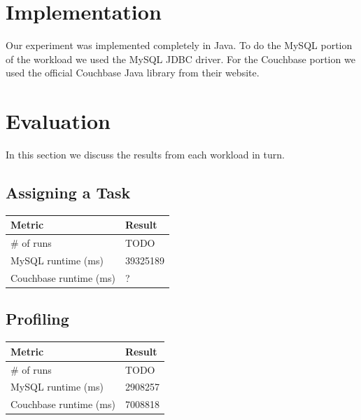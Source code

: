 \documentclass[]{IEEEtran}
\begin{document}
\section{Implementation}\label{sec:implementation}
Our experiment was implemented completely in Java. To do the MySQL portion of
the workload we used the MySQL JDBC driver. For the Couchbase portion we used
the official Couchbase Java library from their website.

\section{Evaluation}\label{sec:eval}
In this section we discuss the results from each workload in turn.


\subsection{Assigning a Task}

\begin{center}
\begin{tabular}{|l|l|}
	\hline
	{\bf Metric} & {\bf Result} \\
	\hline
        \# of runs & TODO \\
        \hline
        MySQL runtime (ms) & 39325189 \\
	\hline
        Couchbase runtime (ms) & ? \\
        \hline
\end{tabular}
\end{center}

\subsection{Profiling}

\begin{center}
\begin{tabular}{|l|l|}
	\hline
	{\bf Metric} & {\bf Result} \\
	\hline
        \# of runs & TODO \\
        \hline
        MySQL runtime (ms) & 2908257 \\
	\hline
        Couchbase runtime (ms) & 7008818 \\
        \hline
\end{tabular}
\end{center}
\end{document}
